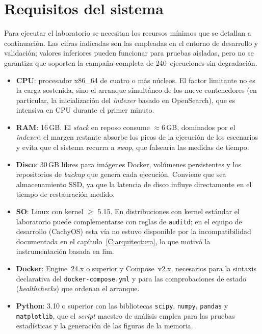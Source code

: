 \documentclass[../main.tex]{subfiles}
\begin{document}
\section{Requisitos del sistema}

Para ejecutar el laboratorio se necesitan los recursos mínimos que se detallan
a continuación. Las cifras indicadas son las empleadas en el entorno de
desarrollo y validación; valores inferiores pueden funcionar para pruebas
aisladas, pero no se garantiza que soporten la campaña completa de
240~ejecuciones sin degradación.

\begin{itemize}
  \item \textbf{CPU}: procesador x86\_64 de cuatro o más núcleos. El factor
    limitante no es la carga sostenida, sino el arranque simultáneo de los
    nueve contenedores (en particular, la inicialización del \emph{indexer}
    basado en OpenSearch), que es intensiva en CPU durante el primer minuto.

  \item \textbf{RAM}: 16\,GB. El \emph{stack} en reposo consume
    $\approx$6\,GB, dominados por el \emph{indexer}; el margen restante
    absorbe los picos de la ejecución de los escenarios y evita que el
    sistema recurra a \emph{swap}, que falsearía las medidas de tiempo.

  \item \textbf{Disco}: 30\,GB libres para imágenes Docker, volúmenes
    persistentes y los repositorios de \emph{backup} que genera cada
    ejecución. Conviene que sea almacenamiento SSD, ya que la latencia
    de disco influye directamente en el tiempo de restauración medido.

  \item \textbf{SO}: Linux con kernel $\geq$ 5.15. En distribuciones con
    kernel estándar el laboratorio puede complementarse con reglas de
    \texttt{auditd}; en el equipo de desarrollo (CachyOS) esta vía no estuvo
    disponible por la incompatibilidad documentada en el
    capítulo~\ref{C:arquitectura}, lo que motivó la instrumentación basada en
    \gls{fim}.

  \item \textbf{Docker}: Engine~24.x o superior y Compose~v2.x, necesarios
    para la sintaxis declarativa del \texttt{docker-compose.yml} y para las
    comprobaciones de estado (\emph{healthchecks}) que ordenan el arranque.

  \item \textbf{Python}: 3.10 o superior con las bibliotecas
    \texttt{scipy}, \texttt{numpy}, \texttt{pandas} y \texttt{matplotlib},
    que el \emph{script} maestro de análisis emplea para las pruebas
    estadísticas y la generación de las figuras de la memoria.
\end{itemize}
\end{document}
